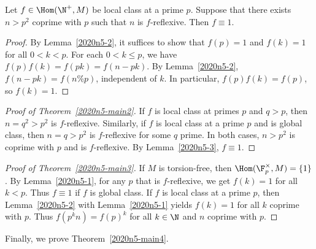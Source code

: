 \begin{lemma}\label{2020n5-3}
Let $f \in \Hom(\N^+, M)$ be local class at a prime $p$.
Suppose that there exists $n > p^2$ coprime with $p$ such that $n$ is $f$-reflexive.
Then $f \equiv 1$.
\end{lemma}
\begin{proof}
By Lemma~\ref{2020n5-2}, it suffices to show that $f(p) = 1$ and $f(k) = 1$ for all $0 < k < p$.
For each $0 < k \leq p$, we have $f(p) f(k) = f(pk) = f(n - pk)$.
By Lemma~\ref{2020n5-2}, $f(n - pk) = f(n \% p)$, independent of $k$.
In particular, $f(p) f(k) = f(p)$, so $f(k) = 1$.
\end{proof}

\begin{proof}[Proof of Theorem~\ref{2020n5-main2}]
If $f$ is local class at primes $p$ and $q > p$, then $n = q^2 > p^2$ is $f$-reflexive.
Similarly, if $f$ is local class at a prime $p$ and is global class, then $n = q > p^2$ is $f$-reflexive for some $q$ prime.
In both cases, $n > p^2$ is coprime with $p$ and is $f$-reflexive.
By Lemma~\ref{2020n5-3}, $f \equiv 1$.
\end{proof}

\begin{proof}[Proof of Theorem~\ref{2020n5-main3}]
If $M$ is torsion-free, then $\Hom(\F_p^{\times}, M) = \{1\}$.
By Lemma~\ref{2020n5-1}, for any $p$ that is $f$-reflexive, we get $f(k) = 1$ for all $k < p$.
Thus $f \equiv 1$ if $f$ is global class.
If $f$ is local class at a prime $p$, then Lemma~\ref{2020n5-2} with Lemma~\ref{2020n5-1} yields $f(k) = 1$ for all $k$ coprime with $p$.
Thus $f(p^k n) = f(p)^k$ for all $k \in \N$ and $n$ coprime with $p$.
\end{proof}

Finally, we prove Theorem~\ref{2020n5-main4}.

